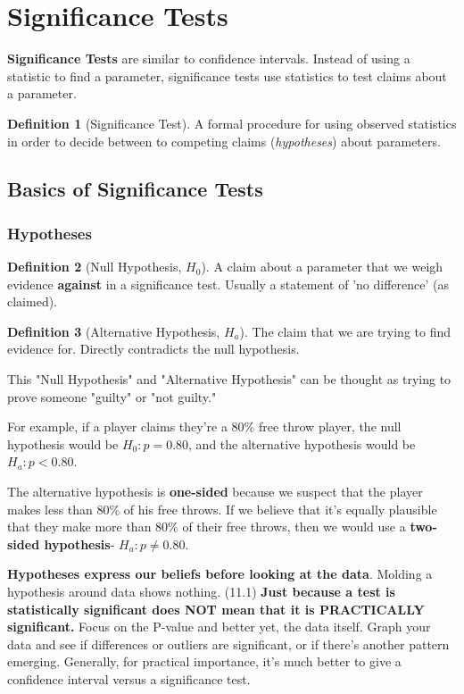 \documentclass[12pt, a4paper]{article}
\theoremstyle{definition}
\newtheorem{definition}{Definition}
\begin{document}
\newpage

\section{Significance Tests}
\textbf{Significance Tests} are similar to confidence intervals. Instead of using a statistic to find a parameter, significance tests use statistics to test claims about a parameter.

\begin{definition}[Significance Test]
    A formal procedure for using observed statistics in order to decide between to competing claims (\textit{hypotheses}) about parameters.
\end{definition}

\subsection{Basics of Significance Tests}
\subsubsection{Hypotheses}
\begin{definition}[Null Hypothesis, $H_0$]
    A claim about a parameter that we weigh evidence \textbf{against} in a significance test. Usually a statement of 'no difference' (as claimed).
\end{definition}

\begin{definition}[Alternative Hypothesis, $H_a$]
    The claim that we are trying to find evidence for. Directly contradicts the null hypothesis.
\end{definition}

This "Null Hypothesis" and "Alternative Hypothesis" can be thought as trying to prove someone "guilty" or "not guilty."

For example, if a player claims they're a 80\% free throw player, the null hypothesis would be $H_0: p = 0.80$, and the alternative hypothesis would be $H_a: p < 0.80$.

The alternative hypothesis is \textbf{one-sided} because we suspect that the player makes less than 80\% of his free throws. If we believe that it's equally plausible that they make more than 80\% of their free throws, then we would use a \textbf{two-sided hypothesis}- $H_a: p \neq 0.80$.

\textbf{Hypotheses express our beliefs before looking at the data}. Molding a hypothesis around data shows nothing.
(11.1) \textbf{Just because a test is statistically significant does NOT mean that it is PRACTICALLY significant.}
Focus on the P-value and better yet, the data itself.
Graph your data and see if differences or outliers are significant, or if there's another pattern emerging.
Generally, for practical importance, it's much better to give a confidence interval versus a significance test.
\end{document}
